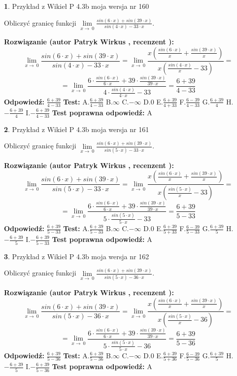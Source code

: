 \documentclass[12pt, a4paper]{article}
\theoremstyle{definition} %
\newtheorem{zad}{}
\newcommand{\zadStart}[1]{\begin{zad}#1\newline}
\newcommand{\zadStop}{\end{zad}}
\newcommand{\rozwStart}[2]{\noindent \textbf{Rozwiązanie (autor #1 , recenzent #2): }\newline}
\newcommand{\rozwStop}{\newline}
\newcommand{\odpStart}{\noindent \textbf{Odpowiedź:}\newline}
\newcommand{\odpStop}{\newline}
\newcommand{\testStart}{\noindent \textbf{Test:}\newline}
\newcommand{\testStop}{\newline}
\newcommand{\kluczStart}{\noindent \textbf{Test poprawna odpowiedź:}\newline}
\newcommand{\kluczStop}{\newline}
\begin{document}
\zadStart{Przykład z Wikieł P 4.3b moja wersja nr 160}


Obliczyć granicę funkcji $\lim\limits_{x\to\ 0}\frac{sin(6 \cdot x)+sin(39 \cdot x)}{sin(4 \cdot x)-33 \cdot x}$.
\zadStop
\rozwStart{Patryk Wirkus}{}
$$\lim\limits_{x\to\ 0}\frac{sin(6 \cdot x)+sin(39 \cdot x)}{sin(4 \cdot x)-33 \cdot x}=\lim\limits_{x\to\ 0}\frac{x(\frac{sin(6 \cdot x)}{x}+\frac{sin(39 \cdot x)}{x})}{x(\frac{sin(4 \cdot x)}{x}-33)}=$$
$$=\lim\limits_{x\to\ 0}\frac{6 \cdot \frac{sin(6 \cdot x)}{6 \cdot x}+39 \cdot \frac{sin(39 \cdot x)}{39 \cdot x}}{4 \cdot \frac{sin(4 \cdot x)}{4 \cdot x}-33}=\frac{6+39}{4-33}$$
\rozwStop
\odpStart
$\frac{6+39}{4-33}$
\odpStop
\testStart
A.$\frac{6+39}{4-33}$
B.$\infty$
C.$-\infty$
D.$0$
E.$\frac{6+39}{4+33}$
F.$\frac{6-39}{4-33}$
G.$\frac{6+39}{4}$
H.$-\frac{6+39}{4}$
I.$-\frac{6+39}{4-33}$
\testStop
\kluczStart
A
\kluczStop



\zadStart{Przykład z Wikieł P 4.3b moja wersja nr 161}


Obliczyć granicę funkcji $\lim\limits_{x\to\ 0}\frac{sin(6 \cdot x)+sin(39 \cdot x)}{sin(5 \cdot x)-33 \cdot x}$.
\zadStop
\rozwStart{Patryk Wirkus}{}
$$\lim\limits_{x\to\ 0}\frac{sin(6 \cdot x)+sin(39 \cdot x)}{sin(5 \cdot x)-33 \cdot x}=\lim\limits_{x\to\ 0}\frac{x(\frac{sin(6 \cdot x)}{x}+\frac{sin(39 \cdot x)}{x})}{x(\frac{sin(5 \cdot x)}{x}-33)}=$$
$$=\lim\limits_{x\to\ 0}\frac{6 \cdot \frac{sin(6 \cdot x)}{6 \cdot x}+39 \cdot \frac{sin(39 \cdot x)}{39 \cdot x}}{5 \cdot \frac{sin(5 \cdot x)}{5 \cdot x}-33}=\frac{6+39}{5-33}$$
\rozwStop
\odpStart
$\frac{6+39}{5-33}$
\odpStop
\testStart
A.$\frac{6+39}{5-33}$
B.$\infty$
C.$-\infty$
D.$0$
E.$\frac{6+39}{5+33}$
F.$\frac{6-39}{5-33}$
G.$\frac{6+39}{5}$
H.$-\frac{6+39}{5}$
I.$-\frac{6+39}{5-33}$
\testStop
\kluczStart
A
\kluczStop



\zadStart{Przykład z Wikieł P 4.3b moja wersja nr 162}


Obliczyć granicę funkcji $\lim\limits_{x\to\ 0}\frac{sin(6 \cdot x)+sin(39 \cdot x)}{sin(5 \cdot x)-36 \cdot x}$.
\zadStop
\rozwStart{Patryk Wirkus}{}
$$\lim\limits_{x\to\ 0}\frac{sin(6 \cdot x)+sin(39 \cdot x)}{sin(5 \cdot x)-36 \cdot x}=\lim\limits_{x\to\ 0}\frac{x(\frac{sin(6 \cdot x)}{x}+\frac{sin(39 \cdot x)}{x})}{x(\frac{sin(5 \cdot x)}{x}-36)}=$$
$$=\lim\limits_{x\to\ 0}\frac{6 \cdot \frac{sin(6 \cdot x)}{6 \cdot x}+39 \cdot \frac{sin(39 \cdot x)}{39 \cdot x}}{5 \cdot \frac{sin(5 \cdot x)}{5 \cdot x}-36}=\frac{6+39}{5-36}$$
\rozwStop
\odpStart
$\frac{6+39}{5-36}$
\odpStop
\testStart
A.$\frac{6+39}{5-36}$
B.$\infty$
C.$-\infty$
D.$0$
E.$\frac{6+39}{5+36}$
F.$\frac{6-39}{5-36}$
G.$\frac{6+39}{5}$
H.$-\frac{6+39}{5}$
I.$-\frac{6+39}{5-36}$
\testStop
\kluczStart
A
\kluczStop
\end{document}
